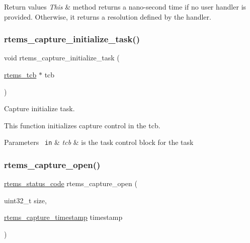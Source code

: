 \begin{DoxyRetVals}{Return values}
{\em This} & method returns a nano-\/second time if no user handler is provided. Otherwise, it returns a resolution defined by the handler. \\
\hline
\end{DoxyRetVals}
\mbox{\label{group__libmisc__capture_gabedd44fdda1ae61040713a475edc133f}} 
\subsubsection{\texorpdfstring{rtems\_capture\_initialize\_task()}{rtems\_capture\_initialize\_task()}}
{\footnotesize\ttfamily void rtems\+\_\+capture\+\_\+initialize\+\_\+task (\begin{DoxyParamCaption}\item[{\mbox{\hyperlink{group__ClassicTasks_gadd9f38f296a7833767355b8236f68908}{rtems\+\_\+tcb}} $\ast$}]{tcb }\end{DoxyParamCaption})}



Capture initialize task. 

This function initializes capture control in the tcb.


\begin{DoxyParams}[1]{Parameters}
\mbox{\texttt{ in}}  & {\em tcb} & is the task control block for the task \\
\hline
\end{DoxyParams}
\mbox{\label{group__libmisc__capture_ga97f17a645e1379b42249b0b3b109e3bb}} 
\subsubsection{\texorpdfstring{rtems\_capture\_open()}{rtems\_capture\_open()}}
{\footnotesize\ttfamily \mbox{\hyperlink{group__ClassicStatus_ga545d41846817eaba6143d52ee4d9e9fe}{rtems\+\_\+status\+\_\+code}} rtems\+\_\+capture\+\_\+open (\begin{DoxyParamCaption}\item[{uint32\+\_\+t}]{size,  }\item[{\mbox{\hyperlink{group__libmisc__capture_gab70845b819ef4c8c57f4f46ce276f0dd}{rtems\+\_\+capture\+\_\+timestamp}}}]{timestamp }\end{DoxyParamCaption})}



